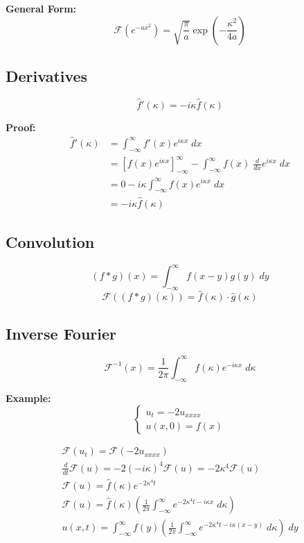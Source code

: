 \documentclass[10pt]{article}
\renewcommand{\hat}[1]{\widehat{#1}}
\newcommand{\F}{\mathcal{F}}
\begin{document}
\textbf{General Form:}
\[\F(e^{-ax^2}) = \sqrt{\frac{\pi}{a}}\exp(-\frac{\kappa^2}{4a})\]

\subsection{Derivatives}
\[\hat{f}'(\kappa) = -i\kappa \hat{f}(\kappa)\]

\textbf{Proof:}
\begin{align*}
    \hat{f}'(\kappa) &= \int_{-\infty}^{\infty} f'(x)e^{i\kappa x}\; dx\\
    &= [f(x)e^{i\kappa x}]_{-\infty}^\infty - \int_{-\infty}^{\infty} f(x)\; \frac{d}{dx}e^{i\kappa x}\; dx\\
    &= 0 - i\kappa \int_{-\infty}^{\infty} f(x)e^{i\kappa x}\; dx\\
    &= -i\kappa \hat{f}(\kappa)
\end{align*}

\subsection{Convolution}
\[(f * g)(x) = \int_{-\infty}^{\infty} f(x - y)g(y)\; dy\]
\[\F((f*g)(\kappa)) = \hat{f}(\kappa)\cdot \hat{g}(\kappa)\]

\subsection{Inverse Fourier}
\[\F^{-1}(x) = \frac{1}{2\pi} \int_{-\infty}^{\infty} f(\kappa) e^{-i\kappa x}\; d\kappa\]

\textbf{Example:} 
\[\begin{cases}
    u_t = -2u_{xxxx}\\
    u(x, 0) = f(x)
\end{cases}\]

\begin{gather*}
    \F(u_t) = \F(-2u_{xxxx})\\
    \frac{d}{dt}\F(u) = -2(-i\kappa)^4 \F(u) = -2\kappa^4 \F(u)\\
    \F(u) = \hat{f}(\kappa)e^{-2\kappa^4 t}\\
    \F(u) = \hat{f}(\kappa)\left(\frac{1}{2\pi} \int_{-\infty}^{\infty} e^{-2\kappa^4 t - i\kappa x}\; d\kappa\right)\\
    u(x, t) = \int_{-\infty}^{\infty} f(y)\left(\frac{1}{2\pi} \int_{-\infty}^{\infty} e^{-2\kappa^4 t - i\kappa (x-y)}\; d\kappa\right)\; dy
\end{gather*}
\end{document}
